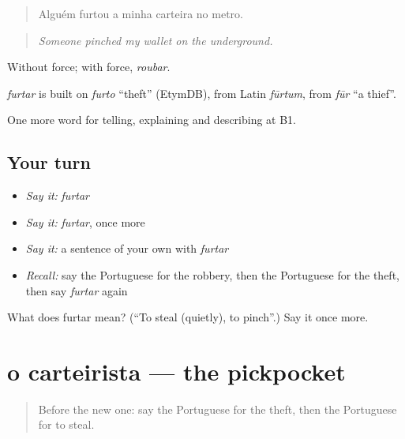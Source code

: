 \begin{quote}
Alguém furtou a minha carteira no metro.
\end{quote}

\begin{quote}
\emph{Someone pinched my wallet on the underground.}
\end{quote}

Without force; with force, \emph{roubar}.

\begin{cousinweb}
\emph{furtar} is built on \emph{furto} \textquotedblleft{}theft\textquotedblright{} (EtymDB), from Latin \emph{fūrtum}, from \emph{fūr} \textquotedblleft{}a thief\textquotedblright{}.
\end{cousinweb}

\begin{grammarlens}[title={What you've built}]
One more word for telling, explaining and describing at B1.
\end{grammarlens}

\subsection*{Your turn}
\begin{itemize}
\raggedright
  \item \emph{Say it:} \emph{furtar}
  \item \emph{Say it:} \emph{furtar}, once more
  \item \emph{Say it:} a sentence of your own with \emph{furtar}
  \item \emph{Recall:} say the Portuguese for the robbery, then the Portuguese for the theft, then say \emph{furtar} again
\end{itemize}

\begin{tcolorbox}[breakable,colback=teal!4,colframe=teal!35!black,title={Before you move on}]
What does furtar mean? (\textquotedblleft{}To steal (quietly), to pinch\textquotedblright{}.) Say it once more.
\end{tcolorbox}
\section[o carteirista]{o carteirista — the pickpocket}

\label{lesson:PT-C287-carteirista}



\begin{quote}
Before the new one: say the Portuguese for the theft, then the Portuguese for to steal.
\end{quote}

